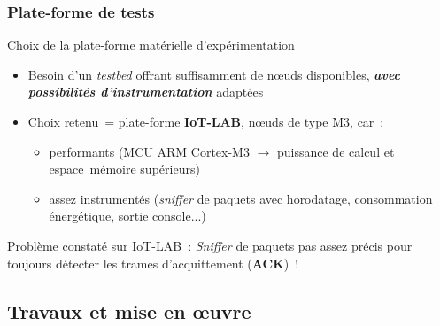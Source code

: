 \documentclass[10pt,c]{beamer}
\newcommand{\lang}[1]{\textit{#1}}
\newcommand{\nom}[1]{\textbf{#1}}
\renewcommand{\emph}[1]{\textbf{\textit{#1}}}
\begin{document}
\begin{frame}[label=Validation3]
\frametitle{Plate-forme de tests}

\vspace{-0.25cm}
\begin{block}{Choix de la plate-forme matérielle d'expérimentation}
\begin{itemize}
\item Besoin d'un \lang{testbed} offrant suffisamment de n{\oe}uds
       disponibles, \emph{avec possibilités d'instrumentation} adaptées
\item Choix retenu~= plate-forme \nom{IoT-LAB}, n{\oe}uds de type M3, car~:
  \begin{itemize}
  \item performants (MCU ARM Cortex-M3 $\rightarrow$ puissance de calcul
         et espace~mémoire supérieurs)
  \item assez instrumentés (\lang{sniffer} de paquets avec horodatage,
         consommation énergétique, sortie console...)
  \end{itemize}
\end{itemize}
\end{block}

\begin{alertblock}{Problème constaté sur IoT-LAB~:}
\lang{Sniffer} de paquets pas assez précis pour toujours détecter
les trames d'acquittement (\nom{ACK})~!
\end{alertblock}

\end{frame}


\subsection{Travaux et mise en {\oe}uvre}
\end{document}
